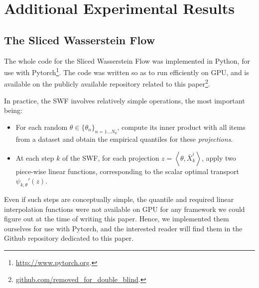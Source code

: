 





\section{Additional Experimental Results}

\subsection{The Sliced Wasserstein Flow}
The whole code for the Sliced Wasserstein Flow was implemented in Python, for use with Pytorch\footnote{\url{http://www.pytorch.org}.}. The code was written so as to run efficiently on GPU, and is available on the publicly available repository related to this paper\footnote{\url{github.com/removed_for_double_blind}.}.

In practice, the SWF involves relatively simple operations, the most important being:
\begin{itemize}
  \item For each random $\theta\in\{\theta_n\}_{n=1\dots N_\theta}$,  compute its inner product with all items from a dataset and obtain the empirical quantiles for these \emph{projections}.
  \item At each step $k$ of the SWF, for each projection $z=\left<\theta, \bar{X}^i_k\right>$, apply two piece-wise linear functions, corresponding to the scalar optimal transport $\psi_{k, \theta}'(z)$.
\end{itemize}
Even if such steps are conceptually simple, the quantile and required linear interpolation functions were not available on GPU for any framework we could figure out at the time of writing this paper. Hence, we implemented them ourselves for use with Pytorch, and the interested reader will find them in the Github repository dedicated to this paper.

